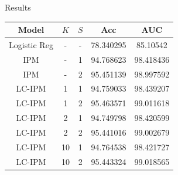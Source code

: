 \documentclass[final]{beamer}
\newlength{\onecolwid}
\newlength{\twocolwid}
\begin{document}
\begin{frame}[t]
\begin{columns}[t]
\begin{column}{\twocolwid}
\begin{columns}[t,totalwidth=\twocolwid]
\begin{column}{\onecolwid}
\end{column} %

\end{columns} %



\begin{block}{Results}


\begin{table}
\vspace{2ex}
\begin{table}
\begin{tabular}{c |c c |c |c}
Model & $K$ & $S$ &  Acc & AUC\\ %
\hline
\hline
Logistic Reg & - & - & 78.340295 & 85.10542\\
\hline
IPM & - & 1  &  94.768623 & 98.418436\\
IPM & - & 2  & 95.451139 & 98.997592\\
\hline
LC-IPM & 1 & 1 & 94.759033& 98.439207\\
LC-IPM & 1 & 2  & 95.463571& 99.011618\\
LC-IPM & 2 & 1  & 94.749798& 98.420599\\
LC-IPM & 2 & 2  & 95.441016& 99.002679\\
LC-IPM & 10 & 1  & 94.764538& 98.421727\\
LC-IPM & 10 & 2  & 95.443324& 99.018565\\
\end{tabular}
\end{table}

\end{table}






\end{block}
\end{column}
\end{columns}
\end{frame}
\end{document}
